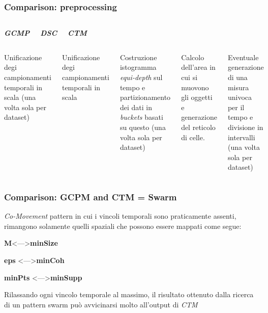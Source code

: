 \documentclass{beamer}
\begin{document}
\begin{frame}
	\frametitle{Comparison: preprocessing}
	\begin{columns}
		
		\begin{center}
			\textbf{\textit{\huge{GCMP}}}
			
		\end{center}
		
		\begin{center}
			\textbf{\textit{\huge{DSC}}}
			
		\end{center}
		
		\begin{center}
			\textbf{\textit{\huge{CTM}}}
			
		\end{center}
	\end{columns}
	\begin{columns}
		
		\column{.3\columnwidth}
		
		Unificazione degi campionamenti temporali in scala  (una volta sola per dataset)
		
		
		\column{.3\textwidth}
		
		Unificazione degi campionamenti temporali in scala
		
		Costruzione istogramma \textit{equi-depth} sul tempo e partizionamento dei dati in \textit{buckets}
		basati su questo  (una volta sola per dataset)
		
		\column{.3\textwidth}
		
		Calcolo dell'area in cui si muovono gli oggetti e generazione del reticolo di celle.
		
		Eventuale generazione di una misura univoca per il tempo e divisione in intervalli 
		 (una volta sola per dataset)
		
	\end{columns}
\end{frame}  



\begin{frame}
	\frametitle{Comparison: GCPM and CTM = Swarm}
 \textit{Co-Movement} pattern in cui i vincoli temporali sono praticamente assenti, 
 rimangono solamente quelli spaziali che possono essere mappati come segue:
 
 \begin{center}
 	\textbf{M}\textless ---\textgreater  \textbf{minSize}
 	
 	\textbf{eps} \textless ---\textgreater  \textbf{minCoh}
 	
 	\textbf{minPts} \textless ---\textgreater  \textbf{minSupp}
 	
 \end{center}
Rilassando ogni vincolo temporale al massimo, il risultato ottenuto dalla ricerca di un pattern swarm può avvicinarsi molto all'output di \textit{CTM}
\end{frame}
\end{document}
